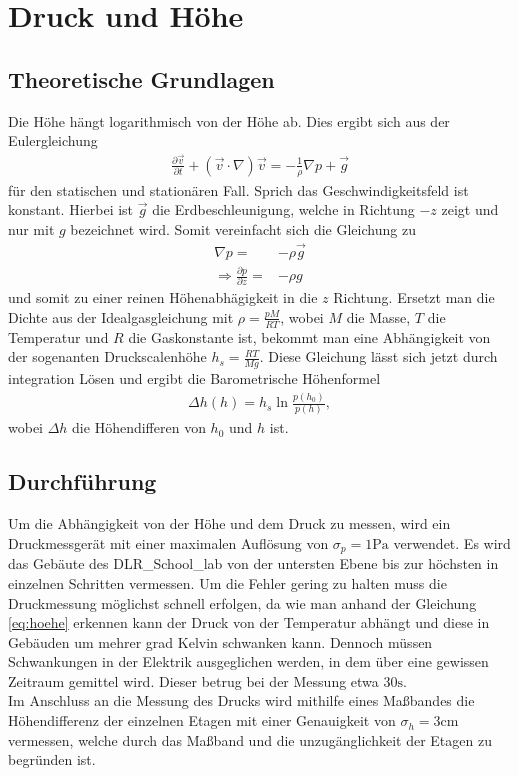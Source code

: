 \documentclass[12pt,a4paper,titlepage,headinclude]{scrartcl}
\numberwithin{equation}{subsection}
\begin{document}
\section{Druck und Höhe}
\label{sec:durchfuehrung}
\subsection{Theoretische Grundlagen}
Die Höhe hängt logarithmisch von der Höhe ab.
Dies ergibt sich aus der Eulergleichung\cite[114]{gerthsen}
\begin{align*}
	\frac{\partial\vec{v}}{\partial t}+\left( \vec{v}\cdot\nabla\right)\vec{v}=-\frac{1}{\rho} \nabla p+ \vec{g}
\end{align*}
für den statischen und stationären Fall.
Sprich das Geschwindigkeitsfeld ist konstant.
Hierbei ist $\vec{g}$ die Erdbeschleunigung, welche in Richtung $-z$ zeigt und nur mit $g$ bezeichnet wird.
Somit vereinfacht sich die Gleichung zu 
\begin{align*}
	\nabla p =& -\rho\vec{g}\\
	\Rightarrow \frac{\partial p}{\partial z} =& -\rho g
\end{align*}
und somit zu einer reinen Höhenabhägigkeit in die $z$ Richtung.
Ersetzt man die Dichte aus der Idealgasgleichung\cite[260]{gerthsen} mit $\rho=\frac{pM}{RT}$, wobei $M$ die Masse, $T$ die Temperatur und $R$ die Gaskonstante ist, bekommt man eine Abhängigkeit von der sogenanten Druckscalenhöhe $h_s=\frac{RT}{Mg}$.
Diese Gleichung lässt sich jetzt durch integration Lösen und ergibt die Barometrische Höhenformel
\begin{align}
	\Delta h(h) = h_s\ln{\frac{p(h_0)}{p(h)}}\label{eq:hoehe},
\end{align}
wobei $\Delta h$ die Höhendifferen von $h_0$ und $h$ ist. 

\subsection{Durchführung}
Um die Abhängigkeit von der Höhe und dem Druck zu messen, wird ein Druckmessgerät mit einer maximalen Auflösung von $\sigma_p=1\si{\pascal}$ verwendet.
Es wird das Gebäute des DLR\_School\_lab von der untersten Ebene bis zur höchsten in einzelnen Schritten vermessen.
Um die Fehler gering zu halten muss die Druckmessung möglichst schnell erfolgen, da wie man anhand der Gleichung \eqref{eq:hoehe} erkennen kann der Druck von der Temperatur abhängt und diese in Gebäuden um mehrer grad Kelvin schwanken kann.
Dennoch müssen Schwankungen in der Elektrik ausgeglichen werden, in dem über eine gewissen Zeitraum gemittel wird.
Dieser betrug bei der Messung etwa $30\si{\second}$.\\
Im Anschluss an die Messung des Drucks wird mithilfe eines Maßbandes die Höhendifferenz der einzelnen Etagen mit einer Genauigkeit von $\sigma_h=3\si{\centi\meter}$ vermessen, welche durch das Maßband und die unzugänglichkeit der Etagen zu begründen ist.
\end{document}
